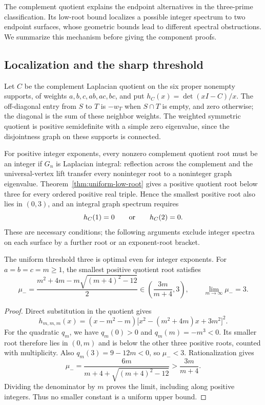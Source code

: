 The complement quotient explains the endpoint alternatives in the
three-prime classification. Its low-root bound localizes a possible
integer spectrum to two endpoint surfaces, whose geometric bounds lead
to different spectral obstructions. We summarize this mechanism before
giving the component proofs.

\subsection{Localization and the sharp threshold}

Let $C$ be the complement Laplacian quotient on the six proper nonempty
supports, of weights $a,b,c,ab,ac,bc$, and put $h_C(x)=\det(xI-C)/x$.
The off-diagonal entry from $S$ to $T$ is $-w_T$ when $S\cap T$ is empty,
and zero otherwise; the diagonal is the sum of these neighbor weights.
The weighted symmetric quotient is positive semidefinite with a simple
zero eigenvalue, since the disjointness graph on these supports is connected.

For positive integer exponents, every nonzero complement quotient root
must be an integer if $G_n$ is Laplacian integral: reflection across the
complement and the universal-vertex lift transfer every noninteger root
to a noninteger graph eigenvalue. Theorem~\ref{thm:uniform-low-root}
gives a positive quotient root below three for every ordered positive
real triple. Hence the smallest positive root also lies in $(0,3)$,
and an integral graph spectrum requires
\[
 h_C(1)=0\qquad\hbox{or}\qquad h_C(2)=0.
\]
These are necessary conditions; the following arguments exclude integer
spectra on each surface by a further root or an exponent-root bracket.

\begin{proposition}
\label{prop:localization-sharpness}
The uniform threshold three is optimal even for integer exponents.
For $a=b=c=m\geq1$, the smallest positive quotient root satisfies
\[
 \mu_-=
 \frac{m^2+4m-m\sqrt{(m+4)^2-12}}{2}
 \in\left(\frac{3m}{m+4},3\right),
 \qquad \lim_{m\to\infty}\mu_-=3.
\]
\end{proposition}
\begin{proof}
Direct substitution in the quotient gives
\[
 h_{m,m,m}(x)=(x-m^2-m)
 \bigl[x^2-(m^2+4m)x+3m^2\bigr]^2.
\]
For the quadratic $q_m$, we have $q_m(0)>0$ and $q_m(m)=-m^3<0$.
Its smaller root therefore lies in $(0,m)$ and is below the other
three positive roots, counted with multiplicity. Also
$q_m(3)=9-12m<0$, so $\mu_-<3$. Rationalization gives
\[
 \mu_-=
 \frac{6m}{m+4+\sqrt{(m+4)^2-12}}
 >\frac{3m}{m+4}.
\]
Dividing the denominator by $m$ proves the limit, including along
positive integers. Thus no smaller constant is a uniform upper bound.
\end{proof}

